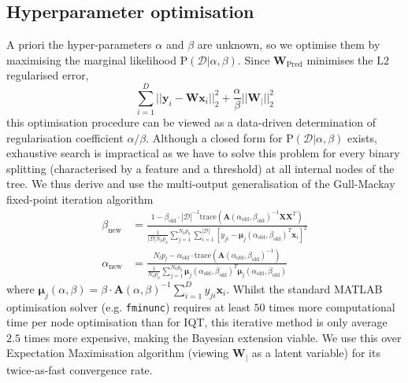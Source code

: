 	\subsection{Hyperparameter optimisation}\label{sec:hyperpara}
	A priori the hyper-parameters $\alpha$ and $\beta$ are unknown, so we optimise them by maximising the marginal likelihood $\text{P}(\mathcal{D}|\alpha,\beta)$. Since $\mathbf{W}_{\text{Pred}}$ minimises the $\text{L}2$ regularised error, 	
	$$ \sum_{i=1}^{D}||\mathbf{y}_i - \mathbf{W}\mathbf{x}_{i}||^2_2 + \frac{\alpha}{\beta}||\mathbf{W}_{|}||^2_2$$
	 this optimisation procedure can be viewed as a data-driven determination of regularisation coefficient $\alpha/\beta$. Although a closed form for $\text{P}(\mathcal{D}|\alpha,\beta)$ exists, exhaustive search is impractical as we have to solve this problem for every binary splitting (characterised by a feature and a threshold) at all internal nodes of the tree. We thus derive and use the multi-output generalisation of the Gull-Mackay fixed-point iteration algorithm \cite{mackay1992bayesian}
	\begin{align}
	\beta_{\text{new}} &= \frac{1 - \beta_{\text{old}}\cdot |\mathcal{D}|^{-1} \text{trace}(\textbf{A}(\alpha_{\text{old}}, \beta_{\text{old}})^{-1}\mathbf{X}\mathbf{X}^{T}) }{\frac{1}{|\mathcal{D}|N_hp_h}\sum_{j=1}^{N_hp_h}\sum_{i=1}^{|\mathcal{D}|}[y_{ji} - \boldsymbol{\mu}_j(\alpha_{\text{old}}, \beta_{\text{old}})^{T}\mathbf{x}_i]^2} \\
	\alpha_{\text{new}}& = \frac{N_lp_l - \alpha_{\text{old}}\cdot \text{trace}(\textbf{A}(\alpha_{\text{old}}, \beta_{\text{old}})^{-1}) }{\frac{1}{N_hp_h}\sum_{j=1}^{N_hp_h}\boldsymbol{\mu}_j(\alpha_{\text{old}}, \beta_{\text{old}})^{T}\boldsymbol{\mu}_j(\alpha_{\text{old}}, \beta_{\text{old}})}
	\end{align}
	where $\boldsymbol{\mu}_j(\alpha, \beta) = \beta \cdot \mathbf{A}(\alpha,\beta)^{-1}\sum_{i=1}^{D}y_{ji}\mathbf{x}_i$.  Whilst the standard MATLAB optimisation solver (e.g. \texttt{fminunc}) requires at least $50$ times more computational time per node optimisation than for IQT, this iterative method is only average $2.5$ times more expensive, making the Bayesian extension viable. We use this over Expectation Maximisation algorithm (viewing $\mathbf{W}_{|}$ as a latent variable) for its twice-as-fast convergence rate. 
	
